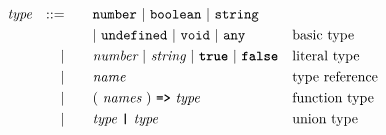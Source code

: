 \begin{alignat*}{9}
&& \textit{type}         && ::= &\quad &&  \texttt{number}\ |\ \texttt{boolean}\ |\ \texttt{string} \\
&&                       &&     &      &&  |\ \texttt{undefined}\ |\ \texttt{void}\ |\ \texttt{any}\ && \textrm{basic type}\\
&&                       && |   &\quad &&  \textit{number}\ |\ \textit{string}\ |\ \textbf{\texttt{true}}\ |\ \textbf{\texttt{false}} && \textrm{literal type}\\
&&                       && |   &\quad &&  \textit{name}   && \textrm{type reference}\\
&&                       && |   &\quad &&   (\ \textit{names}\ )\ \texttt{\textbf{=>}}\ \textit{type} && \textrm{function type}\\
&&                       && |   &\quad &&   \textit{type}\ \texttt{\textbf{|}}\ \textit{type} && \textrm{union type}\\
\end{alignat*}
